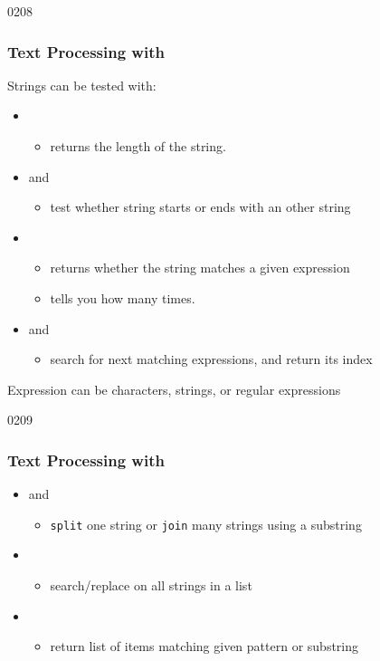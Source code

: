 \begin{slide}{0208}\frametitle{Text Processing with }
    Strings can be tested with:
    \begin{itemize}
      \item {} 
      \begin{itemize}    
        \item returns the length of the string.
      \end{itemize}
      \item {} and  
      \begin{itemize}    
        \item test whether string starts or ends with an other string
      \end{itemize}    
      \item {} 
      \begin{itemize}
        \item returns whether the string matches a given expression
        \item {} tells you how many times.
      \end{itemize}
      \item {} and  
      \begin{itemize}    
        \item search for next matching expressions, and return its index
      \end{itemize}    
    \end{itemize}
    Expression can be characters, strings, or regular expressions
\end{slide}

\begin{slide}{0209}\frametitle{Text Processing with }
\begin{itemize}
\item {} and 
\begin{itemize}
  \item \texttt{split} one string or \texttt{join} many strings using a substring
\end{itemize} 
\item {} 
  \begin{itemize}
    \item search/replace on all strings in a list
  \end{itemize} 
  \item {} 
    \begin{itemize}
      \item return list of items matching given pattern or substring
    \end{itemize} 
\end{itemize}
\end{slide}

